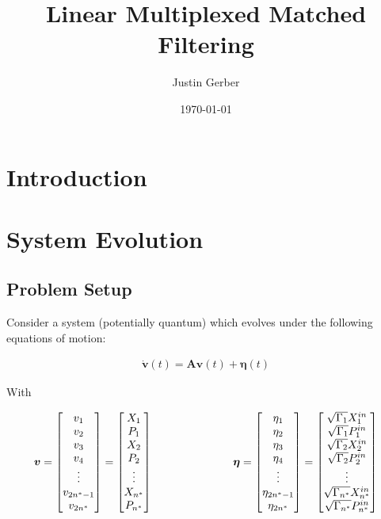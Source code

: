 \documentclass[12pt]{article}
\newcommand{\bv}[1]{\boldsymbol{#1}}
\begin{document}
\title{Linear Multiplexed Matched Filtering}
\author{Justin Gerber}
\date{\today}
\maketitle

\section{Introduction}

\section{System Evolution}
\subsection{Problem Setup}
Consider a system (potentially quantum) which evolves under the following equations of motion:

\begin{align}
\dot{\bv{v}}(t) = \bv{A}\bv{v}(t) + \bv{\eta}(t)
\end{align}

With

\begin{align}
\bv{v} =
\begin{bmatrix}
v_1\\
v_2\\
v_3\\
v_4\\
\vdots\\
v_{2n^*-1}\\
v_{2n^*}
\end{bmatrix}
=
\begin{bmatrix}
X_1\\
P_1\\
X_2\\
P_2\\
\vdots\\
X_{n^*}\\
P_{n^*}
\end{bmatrix}
\hspace{1 in}
\bv{\eta} =
\begin{bmatrix}
\eta_1\\
\eta_2\\
\eta_3\\
\eta_4\\
\vdots\\
\eta_{2n^*-1}\\
\eta_{2n^*}
\end{bmatrix}
=
\begin{bmatrix}
\sqrt{\Gamma_1}X^{in}_1\\
\sqrt{\Gamma_1}P^{in}_1\\
\sqrt{\Gamma_2}X^{in}_2\\
\sqrt{\Gamma_2}P^{in}_2\\
\vdots\\
\sqrt{\Gamma_{n^*}}X^{in}_{n^*}\\
\sqrt{\Gamma_{n^*}}P^{in}_{n^*}
\end{bmatrix}
\end{align}
\end{document}
